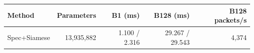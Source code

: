 \begin{tabular}{lrrrr}
\toprule Method & Parameters & B1 (ms) & B128 (ms) & B128 packets/s\\
\midrule
Spec+Siamese & 13,935,882 & 1.100 / 2.316 & 29.267 / 29.543 & 4,374\\
\bottomrule
\end{tabular}
